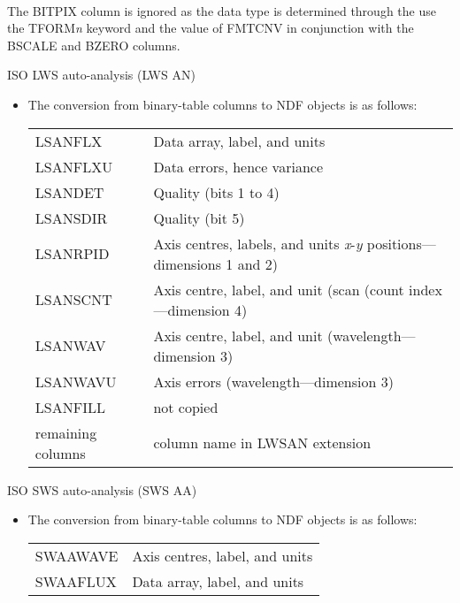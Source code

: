 \documentclass[twoside,11pt]{article}
\newcommand{\ssthitemlist}[1]{
  \latexonly{
  \mbox{} \\
  \vspace{-3.5ex}
  }
  \begin{itemize}
     #1
  \end{itemize}
}
\newcommand{\sstitem}{\item}
\newcommand{\sstitem}{\item}
\begin{document}
{{{{            \\[\medskipamount]
            The BITPIX column is ignored as the data type is determined
            through the use the TFORM\textit{n} keyword and the value of 
            FMTCNV in conjunction with the BSCALE and BZERO columns.
         }
         \bigskip
         \sstitem
         ISO LWS auto-analysis (LWS AN)
         \ssthitemlist{
            \sstitem
            The conversion from binary-table columns to NDF objects is
            as follows:
            \\[\medskipamount]
            \begin{tabular}{lp{90mm}}
               LSANFLX            &   Data array, label, and units \\
               LSANFLXU           &   Data errors, hence variance \\
               LSANDET            &   Quality (bits 1 to 4) \\
               LSANSDIR           &   Quality (bit 5) \\
               LSANRPID           &   Axis centres, labels, and units
                                      \textit{x}-\textit{y} positions---
                                      dimensions 1 and 2) \\
               LSANSCNT           &   Axis centre, label, and unit (scan
                                      (count index---dimension 4) \\
               LSANWAV            &   Axis centre, label, and unit
                                      (wavelength---dimension 3) \\
               LSANWAVU           &   Axis errors (wavelength---dimension 3) \\
               LSANFILL           &   not copied \\
               remaining columns  &   column name in LWSAN extension \\
            \end{tabular}
         }
         \bigskip
         \sstitem
         ISO SWS auto-analysis (SWS AA)
         \ssthitemlist{
            \sstitem
            The conversion from binary-table columns to NDF objects is
            as follows:
            \\[\medskipamount]
            \begin{tabular}{ll}
               SWAAWAVE           &   Axis centres, label, and units \\
               SWAAFLUX           &   Data array, label, and units \\

\end{tabular}}}}}
\end{document}
